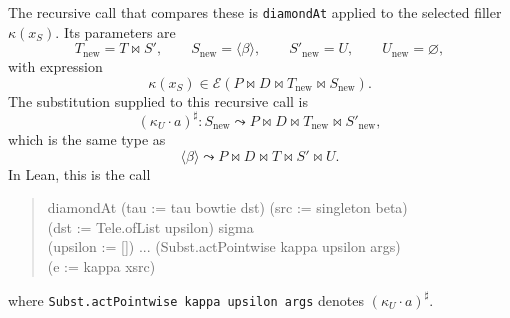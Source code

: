 \documentclass[11pt]{article}
\newcommand{\E}{\mathcal E}
\begin{document}
The recursive call that compares these is \texttt{diamondAt} applied to the
selected filler \(\kappa(x_S)\).  Its parameters are
\[
  T_{\mathrm{new}} = T \bowtie S',
  \qquad
  S_{\mathrm{new}}=\langle\beta\rangle,
  \qquad
  S'_{\mathrm{new}}=U,
  \qquad
  U_{\mathrm{new}}=\varnothing,
\]
with expression
\[
  \kappa(x_S)
  \in
  \E(P \bowtie D \bowtie T_{\mathrm{new}}
    \bowtie S_{\mathrm{new}}).
\]
The substitution supplied to this recursive call is
\[
  (\kappa_U \cdot a)^\sharp :
  S_{\mathrm{new}}
  \leadsto
  P \bowtie D \bowtie T_{\mathrm{new}} \bowtie S'_{\mathrm{new}},
\]
which is the same type as
\[
  \langle\beta\rangle
  \leadsto
  P \bowtie D \bowtie T \bowtie S' \bowtie U.
\]
In Lean, this is the call
\begin{quote}
\small\ttfamily
diamondAt (tau := tau bowtie dst) (src := singleton beta)\\
\hspace*{2em}(dst := Tele.ofList upsilon) sigma\\
\hspace*{2em}(upsilon := []) ... (Subst.actPointwise kappa upsilon args)\\
\hspace*{2em}(e := kappa xsrc)
\end{quote}
where \texttt{Subst.actPointwise kappa upsilon args} denotes
\((\kappa_U \cdot a)^\sharp\).
\end{document}
